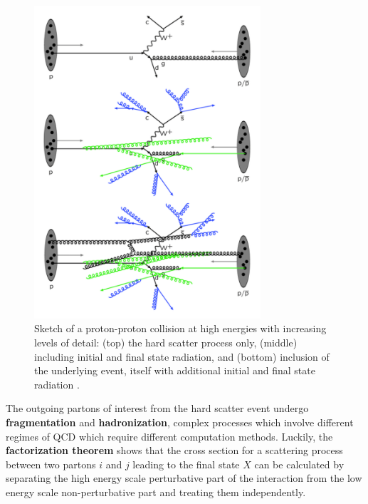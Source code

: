 \begin{figure}
	\centering
	\includegraphics[width=0.75\textwidth]{proton_collision_complications}
	\caption{
	Sketch of a proton-proton collision at high energies with increasing levels of detail: (top) the hard scatter process only, (middle) including initial and final state radiation, and (bottom) inclusion of the underlying event, itself with additional initial and final state radiation \cite{Bechtel:2009zza}.
	}
	\label{fig:proton_collision_complications}
\end{figure}

The outgoing partons of interest from the hard scatter event undergo \textbf{fragmentation} and \textbf{hadronization}, complex processes which involve different regimes of QCD which require different computation methods.
Luckily, the \textbf{factorization theorem} shows that the cross section for a scattering process between two partons $i$ and $j$ leading to the final state $X$ can be calculated by separating the high energy scale perturbative part of the interaction from the low energy scale non-perturbative part and treating them independently.


